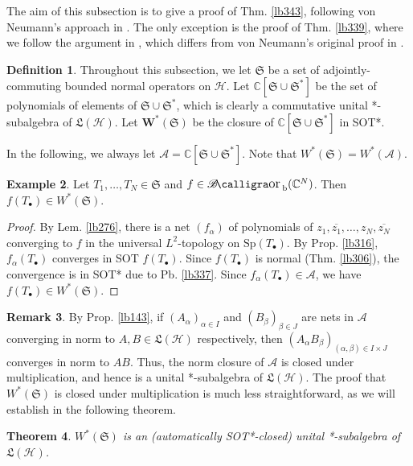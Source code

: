 \documentclass[12pt,b5paper,notitlepage]{article}
\theoremstyle{definition}
\newtheorem{df}{Definition}[subsection]
\newtheorem{eg}[df]{Example}
\newtheorem{rem}[df]{Remark}
\theoremstyle{plain}
\newtheorem{thm}[df]{Theorem}
\DeclareMathOperator{\Borb}{{\mathscr{B}\text{\kern -2pt {\calligra\large or}}\,}_{\mathrm b}}
\newcommand{\fk}{\mathfrak}
\newcommand{\ovl}{\overline}
\newcommand{\blt}{\bullet}
\newcommand{\Cbb}{\mathbb C}
\newcommand{\Sp}{\mathrm{Sp}}
\newcommand{\MH}{\mathcal H}
\newcommand{\SA}{\mathscr A}
\numberwithin{equation}{section}
\begin{document}
The aim of this subsection is to give a proof of Thm. \ref{lb343}, following von Neumann's approach in \cite{vN31}. The only exception is the proof of Thm. \ref{lb339}, where we follow the argument in \cite[Lem. II.2.8]{Dav}, which differs from von Neumann's original proof in \cite{vN29b}.






\begin{df}\label{lb336}
Throughout this subsection, we let $\fk S$ be a set of adjointly-commuting bounded normal operators on $\MH$. Let $\pmb{\Cbb[\fk S\cup\fk S^*]}$ be the set of polynomials of elements of $\fk S\cup\fk S^*$, which is clearly a commutative unital *-subalgebra of $\fk L(\MH)$. Let $\pmb {W^*(\fk S)}$ be the closure of $\Cbb[\fk S\cup\fk S^*]$ in SOT*.
\end{df}

In the following, we always let $\SA=\Cbb[\fk S\cup\fk S^*]$. Note that $W^*(\fk S)=W^*(\SA)$.

\begin{eg}\label{lb340}
Let $T_1,\dots,T_N\in\fk S$ and $f\in\Borb(\Cbb^N)$. Then $f(T_\blt)\in W^*(\fk S)$.
\end{eg}


\begin{proof}
By Lem. \ref{lb276}, there is a net $(f_\alpha)$ of polynomials of $z_1,\ovl{z_1},\dots,z_N,\ovl{z_N}$ converging to $f$ in the universal $L^2$-topology on $\Sp(T_\blt)$. By Prop. \ref{lb316}, $f_\alpha(T_\blt)$ converges in SOT $f(T_\blt)$. Since $f(T_\blt)$ is normal (Thm. \ref{lb306}), the convergence is in SOT* due to Pb. \ref{lb337}. Since $f_\alpha(T_\blt)\in\SA$, we have $f(T_\blt)\in W^*(\fk S)$.
\end{proof}


\begin{rem}
By Prop. \ref{lb143}, if $(A_\alpha)_{\alpha\in I}$ and $(B_\beta)_{\beta\in J}$ are nets in $\SA$ converging in norm to $A,B\in\fk L(\MH)$ respectively, then $(A_\alpha B_\beta)_{(\alpha,\beta)\in I\times J}$ converges in norm to $AB$. Thus, the norm closure of $\SA$ is closed under multiplication, and hence is a unital *-subalgebra of $\fk L(\MH)$. The proof that $W^*(\fk S)$ is closed under multiplication is much less straightforward, as we will establish in the following theorem.
\end{rem}


\begin{thm}\label{lb338}
$W^*(\fk S)$ is an (automatically SOT*-closed) unital *-subalgebra of $\fk L(\MH)$.
\end{thm}
\end{document}
